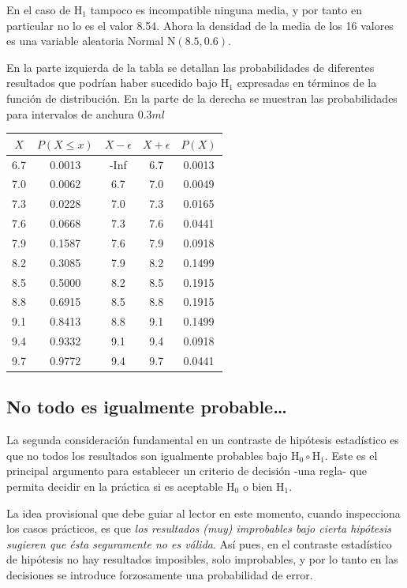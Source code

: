 \documentclass[
]{article}
\begin{document}
En el caso de \(\mathrm{H}_{1}\) tampoco es incompatible ninguna media, y por tanto en particular no lo es el valor 8.54. Ahora la densidad de la media de los 16 valores es una variable aleatoria Normal \(\mathrm{N}(8.5,0.6)\).

En la parte izquierda de la tabla se detallan las probabilidades de diferentes resultados que podrían haber sucedido bajo \(\mathrm{H}_{1}\) expresadas en términos de la función de distribución. En la parte de la derecha se muestran las probabilidades para intervalos de anchura \(0.3 ml\)

\begin{tabular}{c|c|c|c|c}
\hline
$X$ & $P(X\leq x)$ & $X-\epsilon$ & $X+\epsilon$ & $P(X)$\\
\hline
6.7 & 0.0013 & -Inf & 6.7 & 0.0013\\
\hline
7.0 & 0.0062 & 6.7 & 7.0 & 0.0049\\
\hline
7.3 & 0.0228 & 7.0 & 7.3 & 0.0165\\
\hline
7.6 & 0.0668 & 7.3 & 7.6 & 0.0441\\
\hline
7.9 & 0.1587 & 7.6 & 7.9 & 0.0918\\
\hline
8.2 & 0.3085 & 7.9 & 8.2 & 0.1499\\
\hline
8.5 & 0.5000 & 8.2 & 8.5 & 0.1915\\
\hline
8.8 & 0.6915 & 8.5 & 8.8 & 0.1915\\
\hline
9.1 & 0.8413 & 8.8 & 9.1 & 0.1499\\
\hline
9.4 & 0.9332 & 9.1 & 9.4 & 0.0918\\
\hline
9.7 & 0.9772 & 9.4 & 9.7 & 0.0441\\
\hline
\end{tabular}

\subsection{No todo es igualmente probable\ldots{}}\label{no-todo-es-igualmente-probable}

La segunda consideración fundamental en un contraste de hipótesis estadístico es que no todos los resultados son igualmente probables bajo \(\mathrm{H}_{0} \circ \mathrm{H}_{1}\). Este es el principal argumento para establecer un criterio de decisión -una regla- que permita decidir en la práctica si es aceptable \(\mathrm{H}_{0}\) o bien \(\mathrm{H}_{1}\).

La idea provisional que debe guiar al lector en este momento, cuando inspecciona los casos prácticos, es que \emph{los resultados (muy) improbables bajo cierta hipótesis sugieren que ésta seguramente no es válida}. Así pues, en el contraste estadístico de hipótesis no hay resultados imposibles, solo improbables, y por lo tanto en las decisiones se introduce forzosamente una probabilidad de error.
\end{document}
